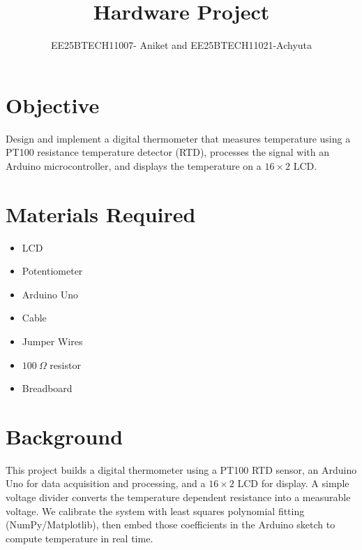 \documentclass[journal]{IEEEtran}
\begin{document}
\title{Hardware Project}
\author{EE25BTECH11007- Aniket and EE25BTECH11021-Achyuta}
\maketitle
{\let\newpage\relax\maketitle}

\setlength{\intextsep}{10pt}
\section{Objective}
Design and implement a digital thermometer that measures temperature using a PT100 resistance temperature detector (RTD), processes the signal with an Arduino microcontroller, and displays the temperature on a $16\times2$ LCD.
\section{Materials Required}
\begin{itemize}
  \item LCD
  \item Potentiometer
  \item Arduino Uno
  \item Cable
  \item Jumper Wires
  \item $100~\Omega$ resistor
  \item Breadboard
\end{itemize}
\section{Background}
 This project builds a digital thermometer using a PT100 RTD sensor, an Arduino Uno for data acquisition and processing, and a $16\times2$ LCD for display. A simple voltage divider
converts the temperature dependent resistance into a measurable voltage. We calibrate the system with least squares polynomial fitting (NumPy/Matplotlib), then embed those coefficients in the Arduino sketch to compute temperature in real time.
\end{document}
